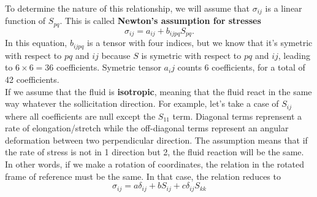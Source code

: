 	  To determine the nature of this relationship, we will assume that $\sigma _{ij} $ is a linear function of $S_{pq}$. This is called \textbf{Newton's assumption for stresses}
	  \begin{equation}
	  	\sigma _{ij} = a_{ij} + b_{ijpq} S_{pq}.
	  \end{equation}
	  In this equation, $b_{ijpq}$ is a tensor with four indices, but we know that it's symetric with respect to $pq$ and $ij$ because $S$ is symetric with respect to $pq$ and $ij$, leading to $6 \times 6 = 36$ coefficients. Symetric tensor $a_ij$ counts 6 coefficients, for a total of 42 coefficients. \\
	  If we assume that the fluid is \textbf{isotropic}, meaning that the fluid react in the same way whatever the sollicitation direction. For example, let's take a case of $S_{ij}$ where all coefficients are null except the $S_{11}$ term. Diagonal terms reprensent a rate of elongation/stretch while the off-diagonal terms represent an angular deformation between two perpendicular direction. The assumption means that if the rate of stress is not in 1 direction but 2, the fluid reaction will be the same. In other words, if we make a rotation of coordinates, the relation in the rotated frame of reference must be the same. In that case, the relation reduces to
	  \begin{equation}
	  	\sigma _{ij} = a \delta _{ij} + bS _{ij} + c \delta _{ij}S_{kk}
	  \end{equation}